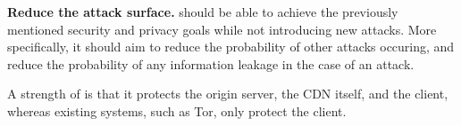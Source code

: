 {\bf Reduce the attack surface.} \system{} should be able to achieve the previously mentioned security 
and privacy goals while not introducing new attacks.  More specifically, it should aim to reduce 
the probability of other attacks occuring, and reduce the probability of any information leakage in 
the case of an attack.




A strength of \system{} is that it protects the origin server, the CDN itself, and the client, whereas 
existing systems, such as Tor, only protect the client.

